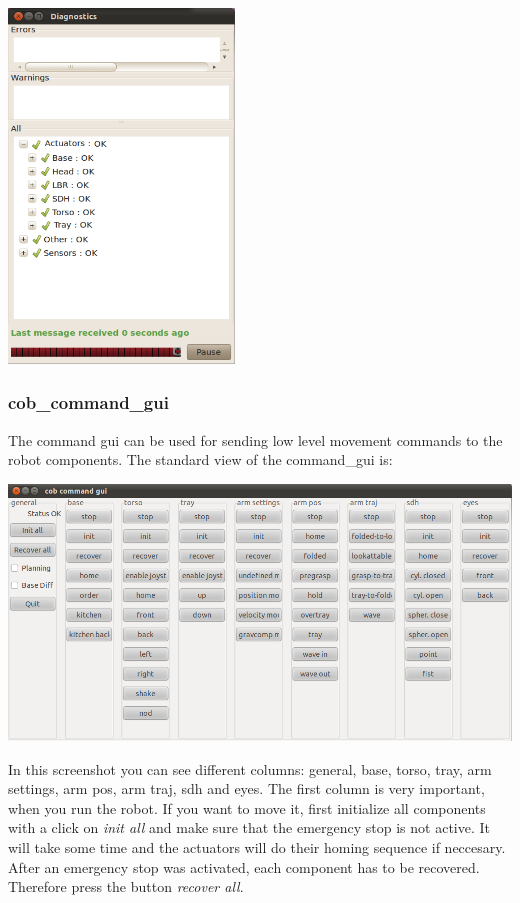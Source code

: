 \begin{center}
\includegraphics[width=0.45\textwidth]{images/diagnostics.png}
\end{center}

\subsubsection{cob\_command\_gui}
The command gui can be used for sending low level movement commands to the robot components. The standard view of the command\_gui is:
\begin{center}
 \includegraphics[width=1\textwidth]{images/cob_command_gui.png}
\end{center}

In this screenshot you can see different columns: general, base, torso, tray, arm settings, arm pos, arm traj, sdh and eyes. The first column is very important, when you run the robot. If you want to move it, first initialize all components with a click on \textit{init all} and make sure that the emergency stop is not active. It will take some time and the actuators will do their homing sequence if neccesary. After an emergency stop was activated, each component has to be recovered. Therefore press the button \textit{recover all}. 


